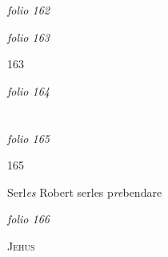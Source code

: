 \documentclass[12pt, a4paper]{book}
\begin{document}
\dotfill
						\newpage
{}

\textit{folio 162}


         \vspace*{4cm}
         
\dotfill
						

\textit{folio 163}


\begin{flushright}{\color{Mahogany}163}\end{flushright}

\dotfill
						\newpage
{}

\textit{folio 164}


         \vspace*{4cm}
         
\dotfill
						  \section*{}  \subsection*{}

\textit{folio 165}



\begin{flushright}{\color{Mahogany}165}\end{flushright}
            		
            			
				\marginpar[\vspace{0.5cm}{\textcolor{Gray}{B}}]{}
			
            			
		\ifthenelse{\isodd{\thepage}}
		{\reversemarginpar}
		{\normalmarginpar}
		Serl\textit{es} Robert serles p\textit{re}bendare

\dotfill
						\newpage
{}

\textit{folio 166}


	
				\begin{center} \begin{large} {\scshape Jehus} \end{large} \end{center}
			
	
		
\end{document}
